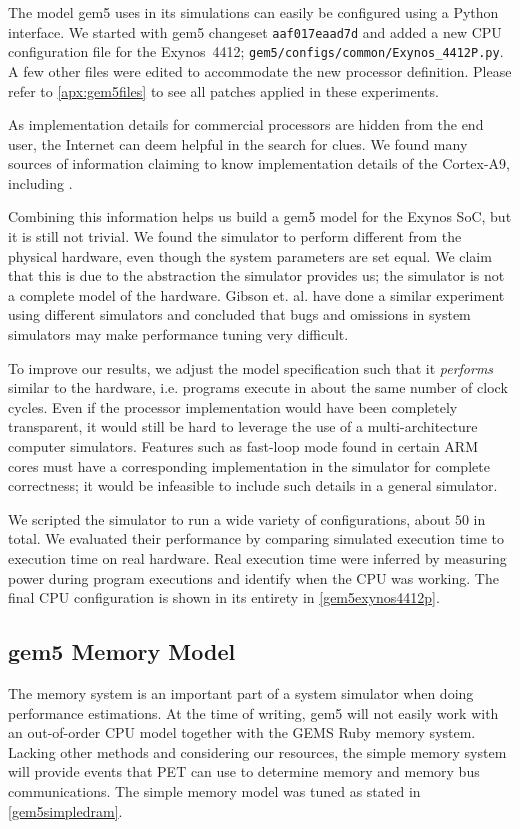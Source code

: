 The model gem5 uses in its simulations can easily be configured using a Python
interface. We started with gem5 changeset \texttt{aaf017eaad7d} and added a new
CPU configuration file for the Exynos~4412;
\texttt{gem5/configs/common/Exynos\_4412P.py}. A few other files were edited to
accommodate the new processor definition. Please refer to
\autoref{apx:gem5files} to see all patches applied in these experiments.

As implementation details for commercial processors are hidden from the end
user, the Internet can deem helpful in the search for clues. We found many
sources of information claiming to know implementation details of the Cortex-A9,
including
\cite{butko2012accuracy,blem2013detailed,armtech,exynoswiki,odroidwiki,geekland,7cpu,armcortexa9specs}.

Combining this information helps us build a gem5 model for the Exynos SoC, but
it is still not trivial.  We found the simulator to perform different from the
physical hardware, even though the system parameters are set equal. We claim
that this is due to the abstraction the simulator provides us; the simulator is
not a complete model of the hardware. Gibson et. al. \cite{gibson2000flash} have
done a similar experiment using different simulators and concluded that bugs and
omissions in system simulators may make performance tuning very difficult.

To improve our results, we adjust the model specification such that it
\textit{performs} similar to the hardware, i.e. programs execute in about the
same number of clock cycles. Even if the processor implementation would have
been completely transparent, it would still be hard to leverage the use of a
multi-architecture computer simulators. Features such as fast-loop mode found in
certain ARM cores must have a corresponding implementation in the simulator for
complete correctness; it would be infeasible to include such details in a
general simulator.

We scripted the simulator to run a wide variety of configurations, about $50$ in
total. We evaluated their performance by comparing simulated execution time to
execution time on real hardware. Real execution time were inferred by measuring
power during program executions and identify when the CPU was working. The final
CPU configuration is shown in its entirety in \autoref{gem5exynos4412p}.


\subsection{gem5 Memory Model}
The memory system is an important part of a
system simulator when doing performance estimations. At the time of writing,
gem5 will not easily work with an out-of-order CPU model together with the GEMS
Ruby memory system. Lacking other methods and considering our resources, the
simple memory system will provide events that PET can use to determine memory
and memory bus communications. The simple memory model was tuned as stated in
\autoref{gem5simpledram}.
